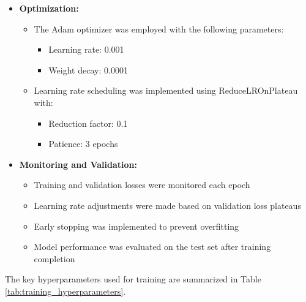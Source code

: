 \begin{itemize}
            \item \textbf{Optimization:}
            \begin{itemize}
                  \item The Adam optimizer was employed with the following parameters:
                        \begin{itemize}
                              \item Learning rate: 0.001
                              \item Weight decay: 0.0001
                        \end{itemize}
                  \item Learning rate scheduling was implemented using ReduceLROnPlateau with:
                        \begin{itemize}
                              \item Reduction factor: 0.1
                              \item Patience: 3 epochs
                        \end{itemize}
            \end{itemize}

            \item \textbf{Monitoring and Validation:}
            \begin{itemize}
                  \item Training and validation losses were monitored each epoch
                  \item Learning rate adjustments were made based on validation loss plateaus
                  \item Early stopping was implemented to prevent overfitting
                  \item Model performance was evaluated on the test set after training completion
            \end{itemize}
      \end{itemize} 
      The key hyperparameters used for training are summarized in Table \ref{tab:training_hyperparameters}.
